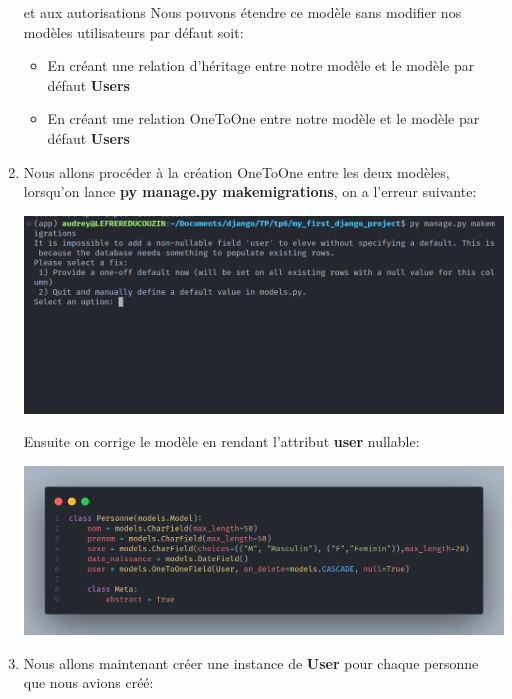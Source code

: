 \documentclass[11pt,a4paper]{article}
\begin{document}
\begin{enumerate}
et aux autorisations Nous pouvons étendre ce modèle sans modifier nos modèles utilisateurs par défaut soit:
	\begin{itemize}
		\item En créant une relation d'héritage entre notre modèle et le modèle par défaut \textbf{Users}
		\item En créant une relation OneToOne entre notre modèle et le modèle par défaut \textbf{Users}
	\end{itemize}
\item Nous allons procéder à la création OneToOne entre les deux modèles, lorsqu'on lance \textbf{py manage.py makemigrations}, on a l'erreur suivante:
\begin{center}
\includegraphics[scale=0.3]{images/error.png}
\end{center}
Ensuite on corrige le modèle en rendant l'attribut \textbf{user} nullable:
\begin{center}
\includegraphics[scale=0.2]{images/per.png}
\end{center}
\item Nous allons maintenant créer une instance de \textbf{User} pour chaque personne que nous avions créé:


\end{enumerate}
\end{document}
